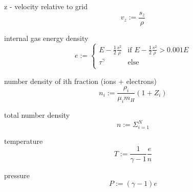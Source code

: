 \documentclass{article}
\begin{document}
z - velocity relative to grid
\begin{equation}
v_z  := \frac{s_z}{\rho} 
\end{equation}

internal gas energy density
\begin{equation}
e    :=  \begin{cases}
       E - \frac{1}{2} \frac{s^2}{\rho} & \text{if } E - \frac{1}{2} \frac{s^2}{\rho} > 0.001 E \\
       \tau^\gamma & \text{else} \\
     \end{cases} 
\end{equation}

number density of ith fraction (ions + electrons)
\begin{equation}
n_i := \frac{\rho_i}{\mu_i m_H} \left ( 1 + Z_i \right ) 
\end{equation}

total number density
\begin{equation}
n := \Sigma_{i=1}^N  
\end{equation}

temperature
\begin{equation}
T := \frac{1}{\gamma-1} \frac{e}{n}
\end{equation}

pressure
\begin{equation}
P := \left(\gamma-1\right) e
\end{equation}
\end{document}
